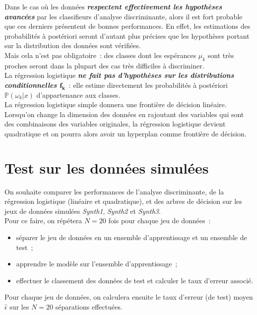 \documentclass[a4paper,10pt]{report}
\begin{document}
Dans le cas où les données \textit{\textbf{respectent effectivement les hypothèses avancées}} par les classifieurs d'analyse discriminante, alors il est fort probable que ces derniers présentent de bonnes performances. En effet, les estimations des probabilités à postériori seront d'autant plus précises que les hypothèses portant sur la distribution des données sont vérifiées.\\
Mais cela n'est pas obligatoire~: des classes dont les espérances $\mu_k$ sont très proches seront dans la plupart des cas très difficiles à discriminer.\\

La régression logistique \textit{\textbf{ne fait pas d'hypothèses sur les distributions conditionnelles $\mathbf{f_k}$}}~: elle estime directement les probabilités à postériori $\mathbb{P}(\omega_k|x)$ d'appartenance aux classes.\\
La régression logistique simple donnera une frontière de décision linéaire. Lorsqu'on change la dimension des données en rajoutant des variables qui sont des combinaisons des variables originales, la régression logistique devient quadratique et on pourra alors avoir un hyperplan comme frontière de décision.





\section{Test sur les données simulées}


On souhaite comparer les performances de l’analyse discriminante, de la régression logistique (linéaire et quadratique), et des arbres de décision sur les jeux de données simulées \textit{Synth1}, \textit{Synth2} et \textit{Synth3}.\\
Pour ce faire, on répétera $N = 20$ fois pour chaque jeu de données~:
\begin{itemize}
	\item séparer le jeu de données en un ensemble d’apprentissage et un ensemble de test~;
	\item apprendre le modèle sur l’ensemble d’apprentissage~;
	\item effectuer le classement des données de test et calculer le taux d’erreur associé.
\end{itemize}

Pour chaque jeu de données, on calculera ensuite le taux d’erreur (de test) moyen $\hat{\epsilon}$ sur les $N = 20$ séparations effectuées.
\end{document}
